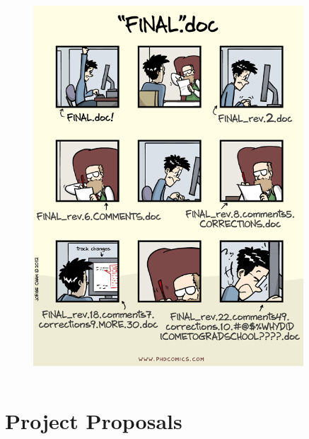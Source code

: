 \documentclass{beamer}
\begin{document}
\begin{frame}
\begin{columns}
   \begin{figure}
    \centering
    \includegraphics[width = 0.9\textwidth]{figs/phd101212s.png}
  \end{figure}
\end{columns}
\end{frame}


\section{Project Proposals}

\end{document}
